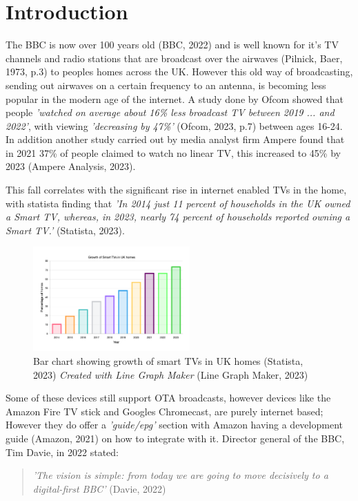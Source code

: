 \section{Introduction}

  The BBC is now over 100 years old (BBC, 2022) and is well known for it's TV channels and radio stations that are broadcast over the airwaves (Pilnick, Baer, 1973, p.3) 
  to peoples homes across the UK. However this old way of broadcasting, sending out airwaves on a certain frequency to an antenna, is becoming 
  less popular in the modern age of the internet. A study done by Ofcom showed that people
  \textit{'watched on average about 16\% less broadcast TV between 2019 ... and 2022'}, with viewing \textit{'decreasing by 47\%'} (Ofcom, 2023, p.7) between ages
  16-24. In addition another study carried out by media analyst firm Ampere found that in 2021 37\% of people claimed to watch no linear TV,
  this increased to 45\% by 2023 (Ampere Analysis, 2023).
  
  This fall correlates with the significant rise in internet enabled TVs in the home, with statista finding that 
  \textit{'In 2014 just 11 percent of households in the UK owned a Smart TV, whereas, in 2023, nearly 74 percent of households reported owning a Smart TV.'} (Statista, 2023).

  \begin{figure}[H]
    \centering
    \includegraphics[width=6cm]{assets/smartTvGrowth.png}
    \caption{Bar chart showing growth of smart TVs in UK homes (Statista, 2023) \textit{Created with Line Graph Maker} (Line Graph Maker, 2023)}
    \label{fig:smartTvGrowth}
  \end{figure}

  Some of these devices still support OTA broadcasts, however devices like the Amazon Fire TV stick and Googles Chromecast, are purely internet
  based; However they do offer a \textit{'guide/epg'} section with Amazon having a development guide (Amazon, 2021) on how to integrate with it.
  Director general of the BBC, Tim Davie, in 2022 stated:
    \begin{quote}
      \textit{'The vision is simple: from today we are going to move decisively to  a digital-first BBC'} (Davie, 2022)
    \end{quote}

